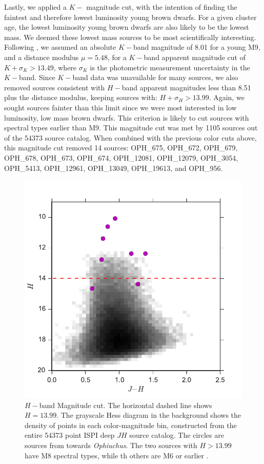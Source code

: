 Lastly, we applied a $K-$ magnitude cut, with the intention of finding the faintest and therefore lowest luminosity young brown dwarfs.  For a given cluster age, the lowest luminosity young brown dwarfs are also likely to be the lowest mass.  We deemed these lowest mass sources to be most scientifically interesting.  Following \citet{allers06}, we assumed an absolute $K-$band magnitude of 8.01 for a young M9, and a distance modulus $\mu=5.48$, for a $K-$band apparent magnitude cut of $K + \sigma_{K} > 13.49$, where $\sigma_K$ is the photometric measurement uncertainty in the $K-$band.  Since $K-$band data was unavailable for many sources, we also removed sources consistent with $H-$band apparent magnitudes less than 8.51 plus the distance modulus, keeping sources with: $H+\sigma_{H} > 13.99$.  Again, we sought sources fainter than this limit since we were most interested in low luminosity, low mass brown dwarfs.  This criterion is likely to cut sources with spectral types earlier than M9.  This magnitude cut was met by 1105 sources out of the 54373 source catalog.  When combined with the previous color cuts above, this magnitude cut removed 14 sources: OPH\_675, OPH\_672, OPH\_679, OPH\_678, OPH\_673, OPH\_674, OPH\_12081, OPH\_12079, OPH\_3054, OPH\_5413, OPH\_12961, OPH\_13049, OPH\_19613, and OPH\_956.

\begin{figure}[ht!]
  \caption{$H-$band Magnitude cut.  The horizontal dashed line shows $H=13.99$.  The grayscale Hess diagram in the background shows the density of points in each color-magnitude bin, constructed from the entire 54373 point ISPI deep $JH$ source catalog.  The circles are sources from \citet{allers06} towards \emph{Ophiuchus}.  The two \citet{allers06} sources with $H>13.99$ have M8 spectral types, while th others are M6 or earlier \citep{2011ASPC..448..633G}. \label{fig_NIR_selection_H}}
\centering
\includegraphics[scale=0.6]{chIMACS/figures/NIR_selection_H_allers_oph}
\end{figure}


